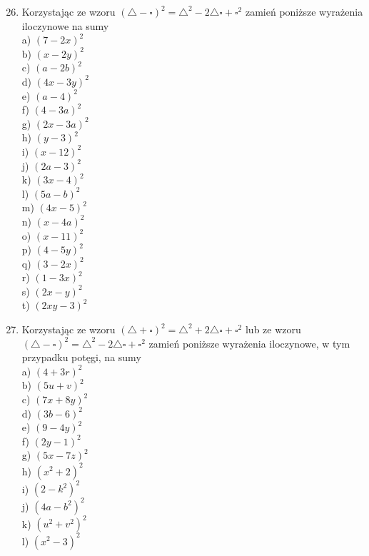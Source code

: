 \documentclass[10pt]{article}
\begin{document}
\begin{enumerate}
  \setcounter{enumi}{25}
  \item Korzystając ze wzoru \((\triangle-\square)^{2}=\triangle^{2}-2 \triangle \square+\square^{2}\) zamień poniższe wyrażenia iloczynowe na sumy\\
a) \((7-2 x)^{2}\)\\
b) \((x-2 y)^{2}\)\\
c) \((a-2 b)^{2}\)\\
d) \((4 x-3 y)^{2}\)\\
e) \((a-4)^{2}\)\\
f) \((4-3 a)^{2}\)\\
g) \((2 x-3 a)^{2}\)\\
h) \((y-3)^{2}\)\\
i) \((x-12)^{2}\)\\
j) \((2 a-3)^{2}\)\\
k) \((3 x-4)^{2}\)\\
l) \((5 a-b)^{2}\)\\
m) \((4 x-5)^{2}\)\\
n) \((x-4 a)^{2}\)\\
o) \((x-11)^{2}\)\\
p) \((4-5 y)^{2}\)\\
q) \((3-2 x)^{2}\)\\
r) \((1-3 x)^{2}\)\\
s) \((2 x-y)^{2}\)\\
t) \((2 x y-3)^{2}\)
  \item Korzystając ze wzoru \((\triangle+\square)^{2}=\triangle^{2}+2 \triangle \square+\square^{2}\) lub ze wzoru \((\triangle-\square)^{2}=\triangle^{2}-2 \triangle \square+\square^{2}\) zamień poniższe wyrażenia iloczynowe, w tym przypadku potęgi, na sumy\\
a) \((4+3 r)^{2}\)\\
b) \((5 u+v)^{2}\)\\
c) \((7 x+8 y)^{2}\)\\
d) \((3 b-6)^{2}\)\\
e) \((9-4 y)^{2}\)\\
f) \((2 y-1)^{2}\)\\
g) \((5 x-7 z)^{2}\)\\
h) \(\left(x^{2}+2\right)^{2}\)\\
i) \(\left(2-k^{2}\right)^{2}\)\\
j) \(\left(4 a-b^{2}\right)^{2}\)\\
k) \(\left(u^{2}+v^{2}\right)^{2}\)\\
l) \(\left(x^{2}-3\right)^{2}\)\\

\end{enumerate}
\end{document}
